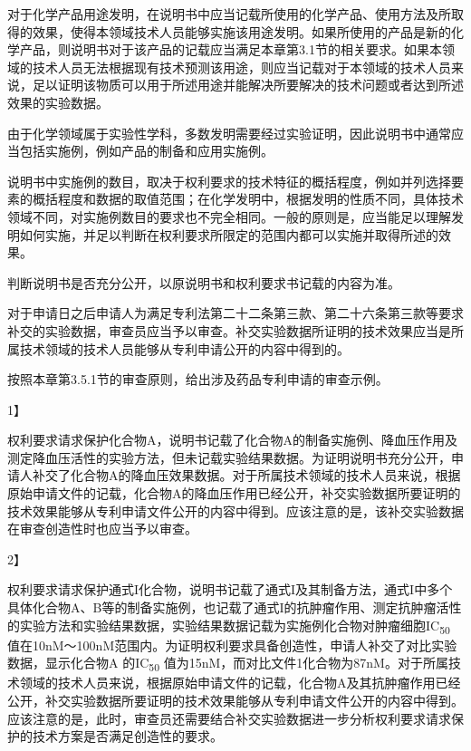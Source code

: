 对于化学产品用途发明，在说明书中应当记载所使用的化学产品、使用方法及所取得的效果，使得本领域技术人员能够实施该用途发明。如果所使用的产品是新的化学产品，则说明书对于该产品的记载应当满足本章第3.1节的相关要求。如果本领域的技术人员无法根据现有技术预测该用途，则应当记载对于本领域的技术人员来说，足以证明该物质可以用于所述用途并能解决所要解决的技术问题或者达到所述效果的实验数据。

由于化学领域属于实验性学科，多数发明需要经过实验证明，因此说明书中通常应当包括实施例，例如产品的制备和应用实施例。

说明书中实施例的数目，取决于权利要求的技术特征的概括程度，例如并列选择要素的概括程度和数据的取值范围；在化学发明中，根据发明的性质不同，具体技术领域不同，对实施例数目的要求也不完全相同。一般的原则是，应当能足以理解发明如何实施，并足以判断在权利要求所限定的范围内都可以实施并取得所述的效果。

判断说明书是否充分公开，以原说明书和权利要求书记载的内容为准。

对于申请日之后申请人为满足专利法第二十二条第三款、第二十六条第三款等要求补交的实验数据，审查员应当予以审查。补交实验数据所证明的技术效果应当是所属技术领域的技术人员能够从专利申请公开的内容中得到的。

按照本章第3.5.1节的审查原则，给出涉及药品专利申请的审查示例。

{1】\par}

权利要求请求保护化合物A，说明书记载了化合物A的制备实施例、降血压作用及测定降血压活性的实验方法，但未记载实验结果数据。为证明说明书充分公开，申请人补交了化合物A的降血压效果数据。对于所属技术领域的技术人员来说，根据原始申请文件的记载，化合物A的降血压作用已经公开，补交实验数据所要证明的技术效果能够从专利申请文件公开的内容中得到。应该注意的是，该补交实验数据在审查创造性时也应当予以审查。

{2】\par}

权利要求请求保护通式I化合物，说明书记载了通式I及其制备方法，通式I中多个具体化合物A、B等的制备实施例，也记载了通式I的抗肿瘤作用、测定抗肿瘤活性的实验方法和实验结果数据，实验结果数据记载为实施例化合物对肿瘤细胞IC\textsubscript{50} 值在10nM～100nM范围内。为证明权利要求具备创造性，申请人补交了对比实验数据，显示化合物A 的IC\textsubscript{50} 值为15nM，而对比文件1化合物为87nM。对于所属技术领域的技术人员来说，根据原始申请文件的记载，化合物A及其抗肿瘤作用已经公开，补交实验数据所要证明的技术效果能够从专利申请文件公开的内容中得到。应该注意的是，此时，审查员还需要结合补交实验数据进一步分析权利要求请求保护的技术方案是否满足创造性的要求。


